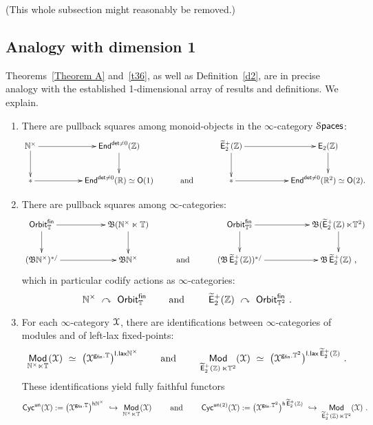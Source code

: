 \documentclass{amsart}
\theoremstyle{definition}
\theoremstyle{remark}
\DeclareMathOperator{\Mod}{\sf Mod}
\DeclareMathOperator{\End}{\sf End}
\newcommand{\lacts}{\curvearrowright}
\DeclareMathOperator{\Spaces}{\cS\mathsf{paces}}
\newcommand{\w}{\widetilde}
\def\sE{\mathsf E}\def\sF{\mathsf F}\def\sG{\mathsf G}\def\sH{\mathsf H}
\DeclareMathOperator{\Ebraid}{\w{\sf E}_{2}^{+}(\ZZ)}
\DeclareMathOperator{\EZ}{\sE_2(\ZZ)}
\begin{document}
{\color{blue}
(This whole subsection might reasonably be removed.)

\subsection{Analogy with dimension 1}

Theorems~\ref{Theorem A} and~\ref{t36}, as well as Definition~\ref{d2}, are in precise analogy with the established 1-dimensional array of results and definitions.  
We explain.
\begin{enumerate}
\item
There are pullback squares among monoid-objects in the $\infty$-category $\Spaces$:
\[
\xymatrix{
\NN^\times \ar[rr]
\ar[d]
&&
\End^{{\sf det}\neq 0}(\ZZ)
\ar[d]
&
&
\Ebraid \ar[rr]
\ar[d]
&&
\EZ
\ar[d]
\\
\ast
\ar[rr]
&&
\End^{{\sf det}\neq 0}(\RR) \simeq \sO(1)
&
\text{ and }
&
\ast
\ar[rr]
&&
\End^{{\sf det}\neq 0}(\RR^2) \simeq \sO(2)
.
}
\]


\item
There are pullback squares among $\infty$-categories:
\[
\xymatrix{
{\sf Orbit}_{\TT}^{\sf fin} 
\ar[rr]
\ar[d]
&&
\fB (\NN^\times \ltimes \TT)
\ar[d]
&
&
{\sf Orbit}_{\TT^2}^{\sf fin}  \ar[rr]
\ar[d]
&&
\fB ( \Ebraid \ltimes \TT^2) 
\ar[d]
\\
( \fB  \NN^\times )^{\ast/}
\ar[rr]
&&
\fB  \NN^\times
&
\text{ and }
&
( \fB \Ebraid )^{\ast/}
\ar[rr]
&&
\fB \Ebraid
~,
}
\]
which in particular codify actions as $\infty$-categories:
\[
\NN^\times 
~\lacts~
{\sf Orbit}_{\TT}^{\sf fin} 
\qquad
\text{ and }
\qquad
\Ebraid
~\lacts~
{\sf Orbit}_{\TT^2}^{\sf fin} 
~.
\]


\item
For each $\infty$-category $\mathcal X$, there are identifications between $\infty$-categories of modules and of left-lax fixed-points:
\[
\Mod_{\NN^\times \ltimes \TT}(\cX)
~\simeq~
\bigl( \cX^{{\sf g}_{\sf fin}. \TT}\bigr)^{{\sf l.lax}\NN^\times}
\qquad
\text{ and }
\qquad
\Mod_{\Ebraid \ltimes \TT^2 }(\cX)
~\simeq~
\bigl( \cX^{{\sf g}_{\sf fin}. \TT^2}\bigr)^{{\sf l.lax}\Ebraid }
~.
\]
These identifications yield fully faithful functors
\begin{equation}
\label{e51}
{\sf Cyc}^{\sf un}(\cX)
:=
\bigl( \cX^{{\sf g}_{\sf fin}. \TT}\bigr)^{{\sf h}\NN^\times}
~\hookrightarrow~
\Mod_{\NN^\times \ltimes \TT}(\cX)
\qquad
\text{ and }
\qquad
{\sf Cyc}^{{\sf un} (2)}(\cX)
:=
\bigl( \cX^{{\sf g}_{\sf fin}. \TT^2}\bigr)^{{\sf h}\Ebraid }
~\hookrightarrow~
\Mod_{\Ebraid  \ltimes \TT^2}(\cX)
~.
\end{equation}




\end{enumerate}}
\end{document}
